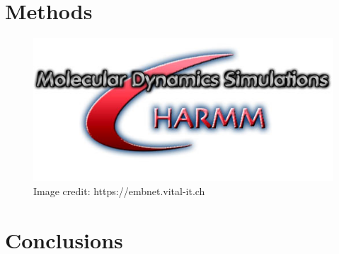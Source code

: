 \graphicspath{{figures/2/}}

\section{Methods}

\begin{figure}[H]
\centering
	\includegraphics[width=\textwidth]{charmm-logo.png}
    \caption[charmm logo]{Image credit: https://embnet.vital-it.ch}
    \label{charmm-logo}
\end{figure}

\section{Conclusions}

